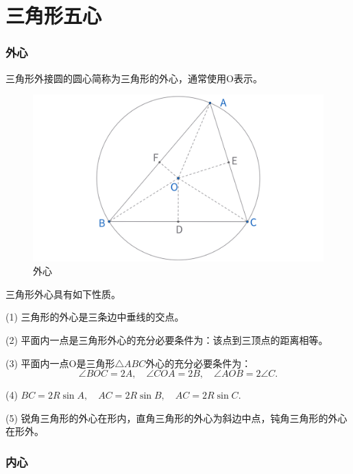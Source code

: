 \part{三角形五心}
\section{外心}

\begin{definition}[外心]
    三角形外接圆的圆心简称为三角形的外心，通常使用O表示。
\end{definition}

\begin{figure}[H]
    \centering
    \includegraphics[width=0.8\linewidth]{figures/三角形五心/外心.png}
    \caption{外心}
\end{figure}

\begin{proposition}[外心性质]
    三角形外心具有如下性质。
    
    (1) 三角形的外心是三条边中垂线的交点。

    (2) 平面内一点是三角形外心的充分必要条件为：该点到三顶点的距离相等。

    (3) 平面内一点O是三角形$\triangle ABC$外心的充分必要条件为：
    $$\angle BOC = 2A,\quad \angle COA = 2B,\quad \angle AOB =2\angle C.$$

    (4) $BC=2R\sin A,\quad AC =2R\sin B,\quad AC=2R\sin C.$

    (5) 锐角三角形的外心在形内，直角三角形的外心为斜边中点，钝角三角形的外心在形外。
\end{proposition}



\newpage 
\section{内心}

